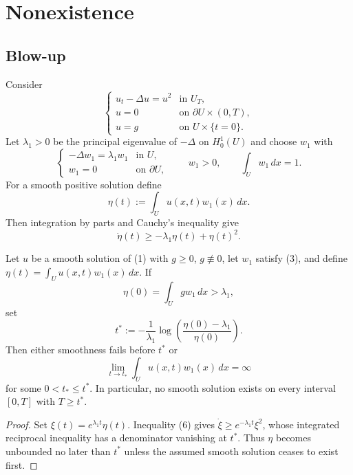 \section{Nonexistence}
\label{sec:nonexistence}

\subsection{Blow-up}
\label{sec:blow-up}

Consider
\[
\begin{cases}
u_t-\Delta u=u^2 & \text{in }U_T,\\
u=0 & \text{on }\partial U\times(0,T),\\
u=g & \text{on }U\times\{t=0\}.
\end{cases}
\tag{1}
\]
Let $\lambda_1>0$ be the principal eigenvalue of $-\Delta$ on $H_0^1(U)$ and choose $w_1$ with
\[
\begin{cases}
-\Delta w_1=\lambda_1w_1 & \text{in }U,\\
w_1=0 & \text{on }\partial U,
\end{cases}
\qquad
w_1>0,
\qquad
\int_Uw_1\,dx=1.
\tag{3}
\]
For a smooth positive solution define
\[
\eta(t):=\int_Uu(x,t)w_1(x)\,dx.
\]
Then integration by parts and Cauchy's inequality give
\[
\dot\eta(t)\geq-\lambda_1\eta(t)+\eta(t)^2.
\tag{6}
\]

\begin{theorem}
\label{thm:blowup-large-data}

Let $u$ be a smooth solution of (1) with $g\geq0$, $g\not\equiv0$, let $w_1$ satisfy (3), and define $\eta(t)=\int_Uu(x,t)w_1(x)\,dx$. If
\[
\eta(0) = \int_U gw_1 \, dx > \lambda_1,
\]
set
\[
t^*:=-\frac1{\lambda_1}\log\left(\frac{\eta(0)-\lambda_1}{\eta(0)}\right).
\tag{10}
\]
Then either smoothness fails before $t^*$ or
\[
\lim_{t \to t_*} \int_U u(x,t)w_1(x) \, dx = \infty
\]
for some $0<t_*\leq t^*$. In particular, no smooth solution exists on every interval $[0,T]$ with $T\geq t^*$.
\end{theorem}

\begin{proof}
\sketch Set $\xi(t)=e^{\lambda_1t}\eta(t)$. Inequality (6) gives $\dot\xi\geq e^{-\lambda_1t}\xi^2$, whose integrated reciprocal inequality has a denominator vanishing at $t^*$. Thus $\eta$ becomes unbounded no later than $t^*$ unless the assumed smooth solution ceases to exist first.
\end{proof}


